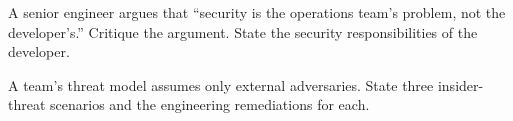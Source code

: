 \begin{exercise}
A senior engineer argues that ``security is the operations team's problem, not the developer's.'' Critique the argument. State the security responsibilities of the developer.
\end{exercise}

\begin{exercise}
A team's threat model assumes only external adversaries. State three insider-threat scenarios and the engineering remediations for each.
\end{exercise}
